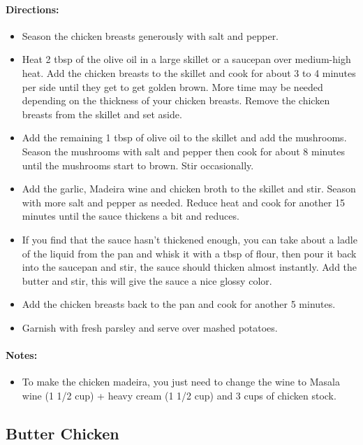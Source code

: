 \documentclass{article}
\begin{document}
\paragraph{Directions:}
\begin{itemize}
	\item Season the chicken breasts generously with salt and pepper.
	\item Heat 2 tbsp of the olive oil in a large skillet or a saucepan over medium-high heat. Add the chicken breasts to the skillet and cook for about 3 to 4 minutes per side until they get to get golden brown. More time may be needed depending on the thickness of your chicken breasts. Remove the chicken breasts from the skillet and set aside.
	\item Add the remaining 1 tbsp of olive oil to the skillet and add the mushrooms. Season the mushrooms with salt and pepper then cook for about 8 minutes until the mushrooms start to brown. Stir occasionally.
	\item Add the garlic, Madeira wine and chicken broth to the skillet and stir. Season with more salt and pepper as needed. Reduce heat and cook for another 15 minutes until the sauce thickens a bit and reduces.
	\item If you find that the sauce hasn’t thickened enough, you can take about a ladle of the liquid from the pan and whisk it with a tbsp of flour, then pour it back into the saucepan and stir, the sauce should thicken almost instantly. Add the butter and stir, this will give the sauce a nice glossy color.
	\item Add the chicken breasts back to the pan and cook for another 5 minutes.
	\item Garnish with fresh parsley and serve over mashed potatoes.	
\end{itemize}

\paragraph{Notes:}
\begin{itemize}
	\item To make the chicken madeira, you just need to change the wine to Masala wine (1 1/2 cup) + heavy cream (1 1/2 cup) and 3 cups of chicken stock.
\end{itemize}

\subsection{Butter Chicken}
\end{document}
